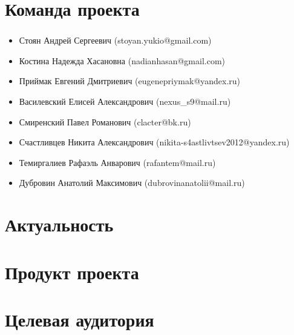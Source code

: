 \documentclass[c]{beamer}  %
\begin{document}
    

\begin{frame}
\end{frame}


\section{Команда проекта}

\begin{frame}
\frametitle{\insertsection} 
\begin{itemize}
    \item Стоян Андрей Сергеевич (stoyan.yukio@gmail.com)
    \item Костина Надежда Хасановна (nadianhasan@gmail.com)
    \item Приймак Евгений Дмитриевич (eugenepriymak@yandex.ru)
    \item Василевский Елисей Александрович (nexus\_s9@mail.ru)
    \item Смиренский Павел Романович (clacter@bk.ru)
    \item Счастливцев Никита Александрович (nikita-s4astlivtsev2012@yandex.ru)
    \item Темиргалиев Рафаэль Анварович (rafantem@mail.ru)
    \item Дубровин Анатолий Максимович (dubrovinanatolii@mail.ru)
\end{itemize}
\end{frame}


\section{Актуальность}

\begin{frame}
\frametitle{\insertsection} 
\framesubtitle{\insertsubsection}
\end{frame}


\section{Продукт проекта}

\begin{frame}
\frametitle{\insertsection} 
\framesubtitle{\insertsubsection}
\end{frame}


\section{Целевая аудитория}
\end{document}

